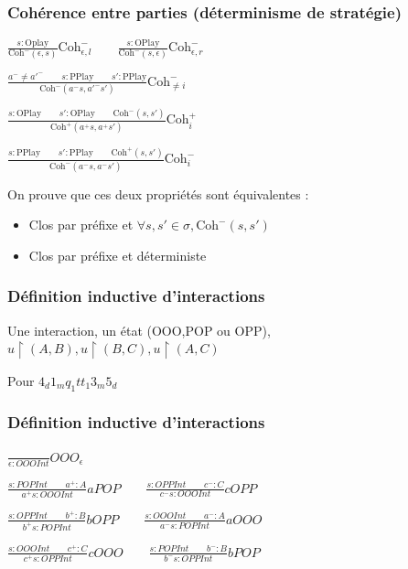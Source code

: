 \documentclass{beamer}
\begin{document}
\begin{frame}
\frametitle{Cohérence entre parties (déterminisme de stratégie)}

$\frac{s:\text{Oplay}}{\text{Coh}^-(\epsilon,s)} \text{Coh}^-_{\epsilon,l} \qquad
 \frac{s:\text{OPlay}}{\text{Coh}^-(s,\epsilon)} \text{Coh}^-_{\epsilon,r}$

$\frac{a^- \neq a'^- \qquad s:\text{PPlay} \qquad s':\text{PPlay}}
{\text{Coh}^-(a^-s, a'^- s')} \text{Coh}^-_{\neq i}$

$\frac{s : \text{OPlay} \qquad s':\text{OPlay} \qquad \text{Coh}^-(s,s')}
{\text{Coh}^+(a^+s, a^+s')} \text{Coh}^+_i$

$\frac{s : \text{PPlay} \qquad s':\text{PPlay} \qquad \text{Coh}^+(s,s')}
{\text{Coh}^-(a^-s, a^-s')} \text{Coh}^-_i$
\pause

On prouve que ces deux propriétés sont équivalentes :
\begin{itemize}
\item Clos par préfixe et $\forall s, s' \in \sigma, \text{Coh}^-(s, s')$
\item Clos par préfixe et déterministe
\end{itemize}

\end{frame}

\begin{frame}
\frametitle{Définition inductive d'interactions}

Une interaction, un état (OOO,POP ou OPP), $u\upharpoonright (A,B), u \upharpoonright (B,C), u \upharpoonright (A,C)$

Pour $4_d 1_m q_1 tt_1 3_m 5_d$

\end{frame}

\begin{frame}
\frametitle{Définition inductive d'interactions}



$\frac{}{\epsilon : OOOInt} OOO_{\epsilon}$

$\frac{s : POPInt \qquad a^+ : A}{a^+ s : OOOInt} aPOP \qquad
 \frac{s : OPPInt \qquad c^- : C}{c^- s : OOOInt} cOPP$

$\frac{s : OPPInt \qquad b^+ : B}{b^+ s : POPInt} bOPP \qquad
 \frac{s : OOOInt \qquad a^- : A}{a^- s : POPInt} aOOO$

$\frac{s : OOOInt \qquad c^+ : C}{c^+ s : OPPInt} cOOO \qquad
 \frac{s : POPInt \qquad b^- : B}{b^- s : OPPInt} bPOP$

\end{frame}
\end{document}
